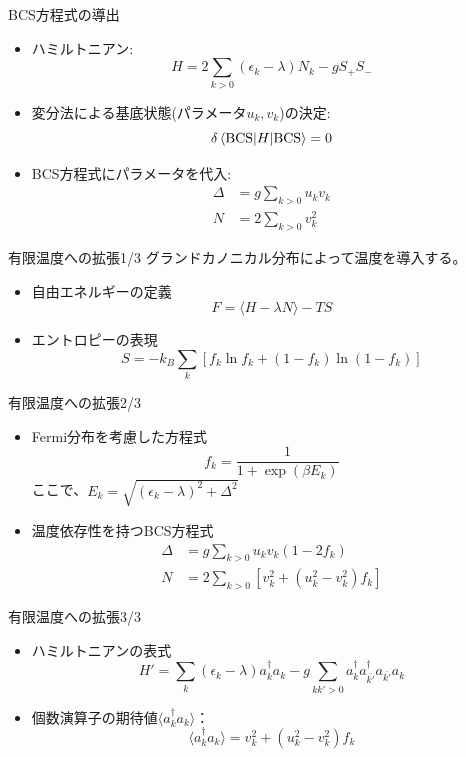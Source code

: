 \documentclass[aspectratio=169, 12pt, dvipdfmx]{beamer}
\begin{document}
\begin{frame}{BCS方程式の導出}
  \begin{itemize}
    \item ハミルトニアン:
    \[
      H = 2\sum_{k>0} (\epsilon_k - \lambda) N_k - g S_+ S_-
    \]
    \item 変分法による基底状態(パラメータ\(u_k,v_k\))の決定:
    \[
    \delta\ev**{H}{\text{BCS}}=0
    \]
    \item BCS方程式にパラメータを代入:
    \begin{align}
      \Delta &=g\sum_{k>0}u_k v_k \\
      N      &= 2\sum_{k>0} v_k^2
    \end{align}
  \end{itemize}
\end{frame}

\begin{frame}{有限温度への拡張1/3}
  グランドカノニカル分布によって温度を導入する。
  \begin{itemize}
    \item 自由エネルギーの定義
    \[
    F = \langle H - \lambda N \rangle -TS 
    \]
    \item エントロピーの表現
    \[
    S = -k_B \sum_{k}\left[f_k \ln f_k +(1 -f_k)\ln (1-f_k) \right]
    \]
  \end{itemize}
\end{frame}

\begin{frame}{有限温度への拡張2/3}
  \begin{itemize}
    \item Fermi分布を考慮した方程式
    \[
    f_k = \frac{1}{1+\exp(\beta E_k)}
    \]ここで、\(E_k = \sqrt{(\epsilon_k-\lambda)^2 +\Delta^2}\)
    \item 温度依存性を持つBCS方程式
    \begin{align}
      \Delta &= g\sum_{k>0} u_k v_k(1 -2f_k)\\
      N      &= 2\sum_{k>0} \left[v_k^2 + (u_k^2-v_k^2)f_k\right]
    \end{align}
  \end{itemize}
\end{frame}

\begin{frame}{有限温度への拡張3/3}
  \begin{itemize}
    \item ハミルトニアンの表式
    \[
      H'=\sum_{k}(\epsilon_k - \lambda)a^{\dagger}_ka_k -g\sum_{kk'>0}a^{\dagger}_{k}a^{\dagger}_{\bar{k'}}a_{\bar{k'}}a_{k}
    \]
    \item 個数演算子の期待値\( \langle a^{\dagger}_k a_k \rangle \)：
    \[
      \langle a^{\dagger}_k a_k \rangle = v_k^2 + (u_k^2 -v_k^2)f_k
    \]
  \end{itemize}
\end{frame}
\end{document}
